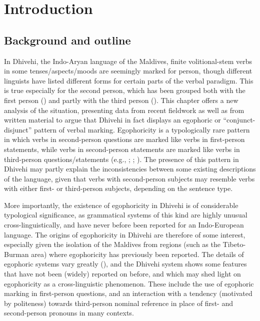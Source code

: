 \documentclass[output=paper]{langsci/langscibook}
\author{Jonathon Lum \affiliation{University of Melbourne}}
\begin{document}
\maketitle

\section{Introduction}\label{s:jl1}

\subsection{Background and outline}\label{s:jl1-1}

In Dhivehi, the Indo-Aryan language of the Maldives, finite volitional-stem verbs in some tenses/aspects/moods are seemingly marked for person, though different linguists have listed different forms for certain parts of the verbal paradigm. This is true especially for the second person, which has been grouped both with the first person (\citealt[23--27]{CainGair2000}) and partly with the third person (\citealt[166--169]{Fritz2002}). This chapter offers a new analysis of the situation, presenting data from recent fieldwork as well as from written material to argue that Dhivehi in fact displays an egophoric or “conjunct-disjunct” pattern of verbal marking. Egophoricity is a typologically rare pattern in which verbs in second-person questions are marked like verbs in first-person statements, while verbs in second-person statements are marked like verbs in third-person questions/statements (e.g., \citealt{Hale1980}; \citealt{Creissels2008}; \citealt{SanRoque2018}). The presence of this pattern in Dhivehi may partly explain the inconsistencies between some existing descriptions of the language, given that verbs with second-person subjects may resemble verbs with either first- or third-person subjects, depending on the sentence type.

More importantly, the existence of egophoricity in Dhivehi is of considerable typological significance, as grammatical systems of this kind are highly unusual cross-linguistically, and have never before been reported for an Indo-European language. The origins of egophoricity in Dhivehi are therefore of some interest, especially given the isolation of the Maldives from regions (such as the Tibeto-Burman area) where egophoricity has previously been reported. The details of egophoric systems vary greatly (\citealt{Floydetal2018}), and the Dhivehi system shows some features that have not been (widely) reported on before, and which may shed light on egophoricity as a cross-linguistic phenomenon. These include the use of egophoric marking in first-person questions, and an interaction with a tendency (motivated by politeness) towards third-person nominal reference in place of first- and second-person pronouns in many contexts.
\end{document}
